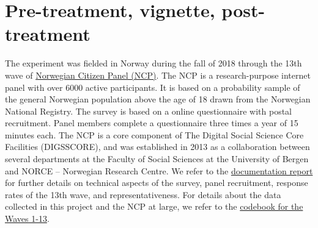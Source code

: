 \documentclass[
]{book}
\newenvironment{Shaded}{\begin{snugshade}}{\end{snugshade}}
\newcommand{\CommentTok}[1]{\textcolor[rgb]{0.56,0.35,0.01}{\textit{#1}}}
\newcommand{\DataTypeTok}[1]{\textcolor[rgb]{0.13,0.29,0.53}{#1}}
\newcommand{\FloatTok}[1]{\textcolor[rgb]{0.00,0.00,0.81}{#1}}
\newcommand{\KeywordTok}[1]{\textcolor[rgb]{0.13,0.29,0.53}{\textbf{#1}}}
\newcommand{\NormalTok}[1]{#1}
\newcommand{\OperatorTok}[1]{\textcolor[rgb]{0.81,0.36,0.00}{\textbf{#1}}}
\newcommand{\OtherTok}[1]{\textcolor[rgb]{0.56,0.35,0.01}{#1}}
\newcommand{\StringTok}[1]{\textcolor[rgb]{0.31,0.60,0.02}{#1}}
\begin{document}
\begin{Shaded}
\end{Shaded}

\hypertarget{pre-treatment-vignette-post-treatment-1}{%
\chapter{Pre-treatment, vignette, post-treatment}\label{pre-treatment-vignette-post-treatment-1}}

The experiment was fielded in Norway during the fall of 2018 through the 13th wave of \href{https://www.uib.no/medborger}{Norwegian Citizen Panel (NCP)}. The NCP is a research-purpose internet panel with over 6000 active participants. It is based on a probability sample of the general Norwegian population above the age of 18 drawn from the Norwegian National Registry. The survey is based on a online questionnaire with postal recruitment. Panel members complete a questionnaire three times a year of 15 minutes each. The NCP is a core component of The Digital Social Science Core Facilities (DIGSSCORE), and was established in 2013 as a collaboration between several departments at the Faculty of Social Sciences at the University of Bergen and NORCE -- Norwegian Research Centre. We refer to the \href{Data/ncp-wave13-documentation.pdf}{documentation report} for further details on technical aspects of the survey, panel recruitment, response rates of the 13th wave, and representativeness. For details about the data collected in this project and the NCP at large, we refer to the \href{Data/ncp-wave13-codebook.pdf}{codebook for the Waves 1-13}.
\end{document}
